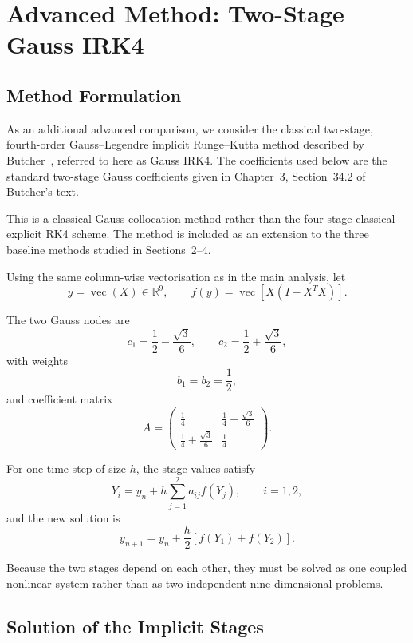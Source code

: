 \section{Advanced Method: Two-Stage Gauss IRK4}

\subsection{Method Formulation}

As an additional advanced comparison, we consider the classical
two-stage, fourth-order Gauss--Legendre implicit Runge--Kutta method
described by Butcher~\cite{butcher2016}, referred to here as Gauss IRK4.
The coefficients used below are the standard two-stage Gauss coefficients
given in Chapter~3, Section~34.2 of Butcher's text.

This is a classical Gauss collocation method rather than the four-stage
classical explicit RK4 scheme. The method is included as an extension
to the three baseline methods studied in Sections~2--4.

Using the same column-wise vectorisation as in the main analysis, let
\[
y=\operatorname{vec}(X)\in\mathbb{R}^{9},
\qquad
f(y)=\operatorname{vec}\!\left[X(I-X^TX)\right].
\]

The two Gauss nodes are
\[
c_1=\frac12-\frac{\sqrt3}{6},
\qquad
c_2=\frac12+\frac{\sqrt3}{6},
\]
with weights
\[
b_1=b_2=\frac12,
\]
and coefficient matrix
\[
A=
\begin{pmatrix}
\frac14 & \frac14-\frac{\sqrt3}{6}\\[1mm]
\frac14+\frac{\sqrt3}{6} & \frac14
\end{pmatrix}.
\]

For one time step of size $h$, the stage values satisfy
\begin{equation}
\label{eq:gauss_stages}
Y_i
=
y_n+h\sum_{j=1}^{2}a_{ij}f(Y_j),
\qquad i=1,2,
\end{equation}
and the new solution is
\begin{equation}
\label{eq:gauss_update}
y_{n+1}
=
y_n+\frac{h}{2}\left[f(Y_1)+f(Y_2)\right].
\end{equation}

Because the two stages depend on each other, they must be solved as one
coupled nonlinear system rather than as two independent nine-dimensional
problems.

\subsection{Solution of the Implicit Stages}

